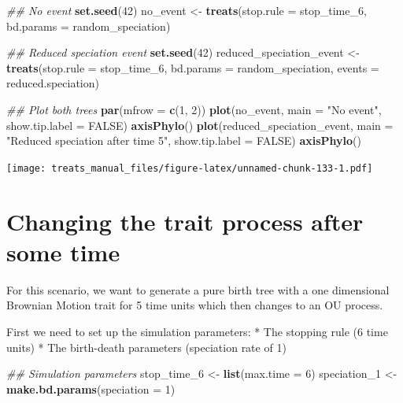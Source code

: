 \documentclass[
]{book}
\newenvironment{Shaded}{\begin{snugshade}}{\end{snugshade}}
\newcommand{\CommentTok}[1]{\textcolor[rgb]{0.56,0.35,0.01}{\textit{#1}}}
\newcommand{\DataTypeTok}[1]{\textcolor[rgb]{0.13,0.29,0.53}{#1}}
\newcommand{\DecValTok}[1]{\textcolor[rgb]{0.00,0.00,0.81}{#1}}
\newcommand{\KeywordTok}[1]{\textcolor[rgb]{0.13,0.29,0.53}{\textbf{#1}}}
\newcommand{\NormalTok}[1]{#1}
\newcommand{\OtherTok}[1]{\textcolor[rgb]{0.56,0.35,0.01}{#1}}
\newcommand{\StringTok}[1]{\textcolor[rgb]{0.31,0.60,0.02}{#1}}
\begin{document}
\begin{Shaded}
\begin{Highlighting}[]
\CommentTok{\#\# No event}
\KeywordTok{set.seed}\NormalTok{(}\DecValTok{42}\NormalTok{)}
\NormalTok{no\_event \textless{}{-}}\StringTok{ }\KeywordTok{treats}\NormalTok{(}\DataTypeTok{stop.rule =}\NormalTok{ stop\_time\_}\DecValTok{6}\NormalTok{,}
                 \DataTypeTok{bd.params =}\NormalTok{ random\_speciation)}

\CommentTok{\#\# Reduced speciation event}
\KeywordTok{set.seed}\NormalTok{(}\DecValTok{42}\NormalTok{)}
\NormalTok{reduced\_speciation\_event \textless{}{-}}\StringTok{ }\KeywordTok{treats}\NormalTok{(}\DataTypeTok{stop.rule =}\NormalTok{ stop\_time\_}\DecValTok{6}\NormalTok{,}
                                 \DataTypeTok{bd.params =}\NormalTok{ random\_speciation,}
                                 \DataTypeTok{events =}\NormalTok{ reduced.speciation)}

\CommentTok{\#\# Plot both trees}
\KeywordTok{par}\NormalTok{(}\DataTypeTok{mfrow =} \KeywordTok{c}\NormalTok{(}\DecValTok{1}\NormalTok{, }\DecValTok{2}\NormalTok{))}
\KeywordTok{plot}\NormalTok{(no\_event, }\DataTypeTok{main =} \StringTok{"No event"}\NormalTok{, }\DataTypeTok{show.tip.label =} \OtherTok{FALSE}\NormalTok{)}
\KeywordTok{axisPhylo}\NormalTok{()}
\KeywordTok{plot}\NormalTok{(reduced\_speciation\_event, }
     \DataTypeTok{main =} \StringTok{"Reduced speciation after time 5"}\NormalTok{, }
     \DataTypeTok{show.tip.label =} \OtherTok{FALSE}\NormalTok{)}
\KeywordTok{axisPhylo}\NormalTok{()}
\end{Highlighting}
\end{Shaded}

\texttt{[image: treats\_manual\_files/figure-latex/unnamed-chunk-133-1.pdf]}

\hypertarget{EG_change_trait}{%
\section{Changing the trait process after some time}\label{EG_change_trait}}

For this scenario, we want to generate a pure birth tree with a one dimensional Brownian Motion trait for 5 time units which then changes to an OU process.

First we need to set up the simulation parameters:
* The stopping rule (6 time units)
* The birth-death parameters (speciation rate of 1)

\begin{Shaded}
\begin{Highlighting}[]
\CommentTok{\#\# Simulation parameters}
\NormalTok{stop\_time\_}\DecValTok{6}\NormalTok{ \textless{}{-}}\StringTok{ }\KeywordTok{list}\NormalTok{(}\DataTypeTok{max.time =} \DecValTok{6}\NormalTok{)}
\NormalTok{speciation\_}\DecValTok{1}\NormalTok{ \textless{}{-}}\StringTok{ }\KeywordTok{make.bd.params}\NormalTok{(}\DataTypeTok{speciation =} \DecValTok{1}\NormalTok{)}
\end{Highlighting}
\end{Shaded}
\end{document}
